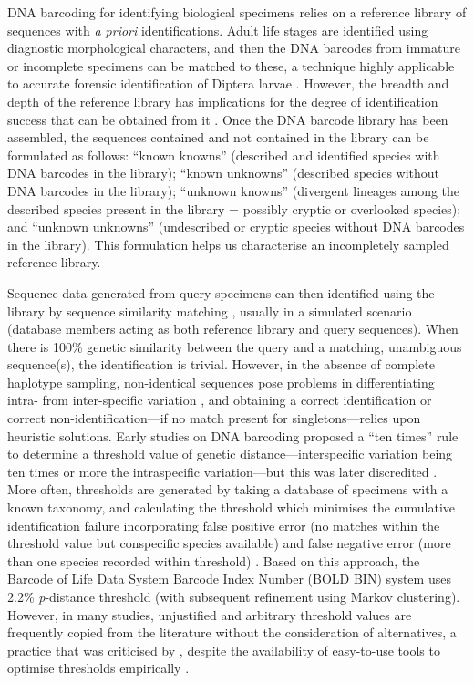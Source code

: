 \documentclass[12pt]{article}
\begin{document}
DNA barcoding for identifying biological specimens relies on a reference library of sequences with \emph{a priori} identifications. Adult life stages are identified using diagnostic morphological characters, and then the DNA barcodes from immature or incomplete specimens can be matched to these, a technique highly applicable to accurate forensic identification of Diptera larvae \citep{Meiklejohn2011}. However, the breadth and depth of the reference library has implications for the degree of identification success that can be obtained from it \citep{Bergsten2012,Virgilio2012,Zhang2012b}. Once the DNA barcode library has been assembled, the sequences contained and not contained in the library can be formulated as follows: ``known knowns'' (described and identified species with DNA barcodes in the library); ``known unknowns'' (described species without DNA barcodes in the library); ``unknown knowns'' (divergent lineages among the described species present in the library = possibly cryptic or overlooked species); and ``unknown unknowns'' (undescribed or cryptic species without DNA barcodes in the library). This formulation helps us characterise an incompletely sampled reference library.

Sequence data generated from query specimens can then identified using the library by sequence similarity matching \citep{Meier2006}, usually in a simulated scenario (database members acting as both reference library and query sequences). When there is 100\% genetic similarity between the query and a matching, unambiguous sequence(s), the identification is trivial. However, in the absence of complete haplotype sampling, non-identical sequences pose problems in differentiating intra- from inter-specific variation \citep{Virgilio2012}, and obtaining a correct identification or correct non-identification---if no match present for singletons---relies upon heuristic solutions. Early studies on DNA barcoding \citep[e.g.][]{Hebert2004} proposed a ``ten times'' rule to determine a threshold value of genetic distance---interspecific variation being ten times or more the intraspecific variation---but this was later discredited \citep{Hickerson2006}. More often, thresholds are generated by taking a database of specimens with a known taxonomy, and calculating the threshold which minimises the cumulative identification failure incorporating false positive error (no matches within the threshold value but conspecific species available) and false negative error (more than one species recorded within threshold) \citep{Meyer2005}. Based on this approach, the Barcode of Life Data System Barcode Index Number (BOLD BIN) system \citep{Ratnasingham2013} uses 2.2\% \emph{p}-distance threshold (with subsequent refinement using Markov clustering). However, in many studies, unjustified and arbitrary threshold values are frequently copied from the literature without the consideration of alternatives, a practice that was criticised by \citet{Collins2013}, despite the availability of easy-to-use tools to optimise thresholds empirically \citep{Brown2012,Puillandre2012b,Virgilio2012,Sonet2013}.
\end{document}
